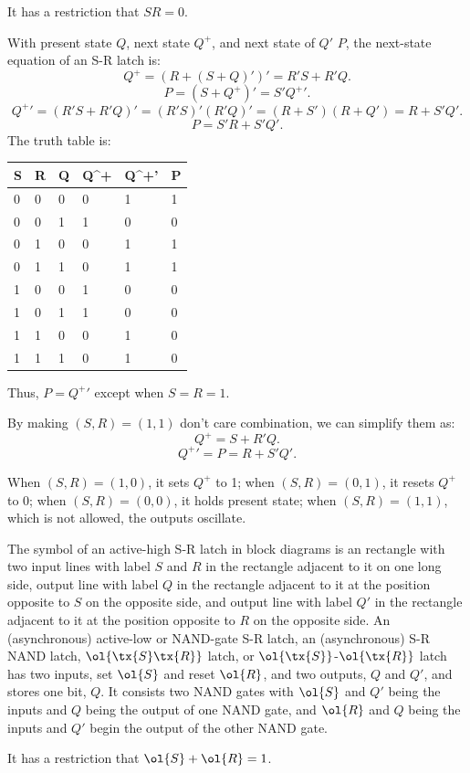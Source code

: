 \documentclass[a4paper,12pt]{report}
\begin{document}
It has a restriction that $SR=0$.

With present state $Q$, next state $Q^+$, and next state of $Q'$ $P$, the next-state equation of an S-R latch is:
\[Q^+=(R+(S+Q)')'=R'S+R'Q.\]
\[P=(S+Q^+)'=S'{Q^+}'.\]
\[{Q^+}'=(R'S+R'Q)'=(R'S)'(R'Q)'=(R+S')(R+Q')=R+S'Q'.\]
\[P=S'R+S'Q'.\]
The truth table is:
\begin{longtable}[c]{|m|m|m|m|m|m|}
\hline
S & R & Q & Q^+ & {Q^+}' & P\\\hline
0 & 0 & 0 & 0 & 1 & 1\\\hline
0 & 0 & 1 & 1 & 0 & 0\\\hline
0 & 1 & 0 & 0 & 1 & 1\\\hline
0 & 1 & 1 & 0 & 1 & 1\\\hline
1 & 0 & 0 & 1 & 0 & 0\\\hline
1 & 0 & 1 & 1 & 0 & 0\\\hline
1 & 1 & 0 & 0 & 1 & 0\\\hline
1 & 1 & 1 & 0 & 1 & 0\\\hline
\end{longtable}
Thus, $P={Q^+}'$ except when $S=R=1$.

By making $(S,R)=(1,1)$ don't care combination, we can simplify them as:
\[Q^+=S+R'Q.\]
\[{Q^+}'=P=R+S'Q'.\]

When $(S,R)=(1,0)$, it sets $Q^+$ to 1; when $(S,R)=(0,1)$, it resets $Q^+$ to 0; when $(S,R)=(0,0)$, it holds present state; when $(S,R)=(1,1)$, which is not allowed, the outputs oscillate.

The symbol of an active-high S-R latch in block diagrams is an rectangle with two input lines with label $S$ and $R$ in the rectangle adjacent to it on one long side, output line with label $Q$ in the rectangle adjacent to it at the position opposite to $S$ on the opposite side, and output line with label $Q'$ in the rectangle adjacent to it at the position opposite to $R$ on the opposite side.
An (asynchronous) active-low or NAND-gate S-R latch, an (asynchronous) S-R NAND latch, $\ol{\tx{S}\tx{R}}$ latch, or $\ol{\tx{S}}$-$\ol{\tx{R}}$ latch has two inputs, set $\ol{S}$ and reset $\ol{R}$, and two outputs, $Q$ and $Q'$, and stores one bit, $Q$. It consists two NAND gates with $\ol{S}$ and $Q'$ being the inputs and $Q$ being the output of one NAND gate, and $\ol{R}$ and $Q$ being the inputs and $Q'$ begin the output of the other NAND gate.

It has a restriction that $\ol{S}+\ol{R}=1$.
\end{document}
